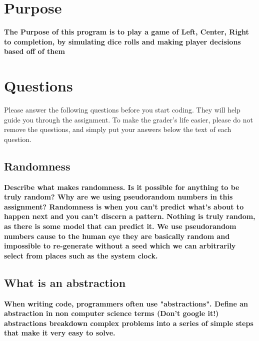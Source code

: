 \documentclass{article}
\title{\ASSIGNMENT}
\author{\NAME}
\date{\CLASS}
\begin{document}
\pagestyle{fancy}
\fancyfoot{}
\fancyhead{}
\fancyfoot[L]{\ASSIGNMENT\ -- \CLASS\ -- \NAME}
\fancyfoot[R]{\thepage}

\maketitle



\section*{Purpose}
\textbf{The Purpose of this program is to play a game of Left, Center, Right to completion, by simulating dice rolls and making player decisions based off of them}

\section{Questions}

Please answer the following questions before you start coding. They will help guide you through the assignment. To make the grader's life easier, please do not remove the questions, and simply put your answers below the text of each question. 

\subsection{Randomness}

\textbf{Describe what makes randomness. Is it possible for anything to be truly random? Why are we using pseudorandom numbers in this assignment?
Randomness is when you can't predict what's about to happen next and you can't discern a pattern. Nothing is truly random, as there is some model that can predict it. We use pseudorandom numbers cause to the human eye they are basically random and impossible to re-generate without a seed which we can arbitrarily select from places such as the system clock.}

\subsection{What is an abstraction}
\textbf{
When writing code, programmers often use "abstractions". Define an abstraction in non computer science terms (Don't google it!)
abstractions breakdown complex problems into a series of simple steps that make it very easy to solve.
}
\end{document}
